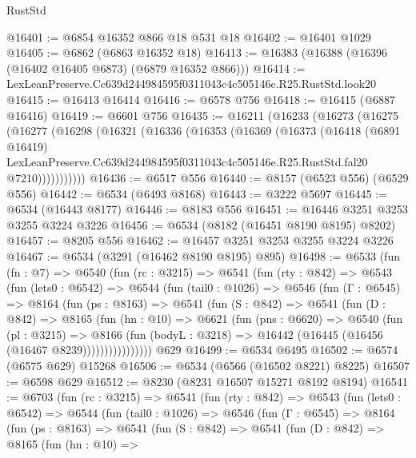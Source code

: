 \begin{lexlean}{RustStd}
\begin{coremodule}
@16401 := @6854 @16352 @866 @18 @531 @18
@16402 := @16401 @1029
@16405 := @6862 (@6863 @16352 @18)
@16413 := @16383 (@16388 (@16396 (@16402 @16405 @6873) (@6879 @16352 @866)))
@16414 := LexLeanPreserve.Cc639d244984595f0311043c4c505146e.R25.RustStd.look20
@16415 := @16413 @16414
@16416 := @6578 @756
@16418 := @16415 (@6887 @16416)
@16419 := @6601 @756
@16435 := @16211
    (@16233
      (@16273
        (@16275
          (@16277
            (@16298
              (@16321
                (@16336
                  (@16353
                    (@16369
                      (@16373
                        (@16418
                          (@6891 @16419)
                          LexLeanPreserve.Cc639d244984595f0311043c4c505146e.R25.RustStd.fal20
                          @7210)))))))))))
@16436 := @6517 @556
@16440 := @8157 (@6523 @556) (@6529 @556)
@16442 := @6534 (@6493 @8168)
@16443 := @3222 @5697
@16445 := @6534 (@16443 @8177)
@16446 := @8183 @556
@16451 := @16446 @3251 @3253 @3255 @3224 @3226
@16456 := @6534 (@8182 (@16451 @8190 @8195) @8202)
@16457 := @8205 @556
@16462 := @16457 @3251 @3253 @3255 @3224 @3226
@16467 := @6534 (@3291 (@16462 @8190 @8195) @895)
@16498 := @6533
    (fun (fn : @7) =>
    @6540
      (fun (rc : @3215) =>
      @6541
        (fun (rty : @842) =>
        @6543
          (fun (lets0 : @6542) =>
          @6544
            (fun (tail0 : @1026) =>
            @6546
              (fun (Γ : @6545) =>
              @8164
                (fun (ps : @8163) =>
                @6541
                  (fun (S : @842) =>
                  @6541
                    (fun (D : @842) =>
                    @8165
                      (fun (hn : @10) =>
                      @6621
                        (fun (pns : @6620) =>
                        @6540
                          (fun (pl : @3215) =>
                          @8166
                            (fun (bodyL : @3218) =>
                            @16442 (@16445 (@16456 (@16467 @8239))))))))))))))))
    @629
@16499 := @6534 @6495
@16502 := @6574 (@6575 @629) @15268
@16506 := @6534 (@6566 (@16502 @8221) @8225)
@16507 := @6598 @629
@16512 := @8230 (@8231 @16507 @15271 @8192 @8194)
@16541 := @6703
    (fun (rc : @3215) =>
    @6541
      (fun (rty : @842) =>
      @6543
        (fun (lets0 : @6542) =>
        @6544
          (fun (tail0 : @1026) =>
          @6546
            (fun (Γ : @6545) =>
            @8164
              (fun (ps : @8163) =>
              @6541
                (fun (S : @842) =>
                @6541
                  (fun (D : @842) =>
                  @8165
                    (fun (hn : @10) =>

\end{coremodule}
\end{lexlean}
